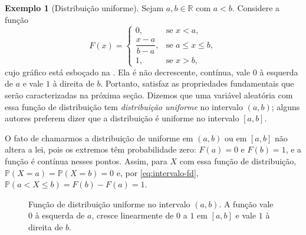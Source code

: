 \documentclass[12pt,portuguese]{article}
\theoremstyle{definition}
\newtheorem{example}[example]{Exemplo}
\theoremstyle{plainexercise}
\theoremstyle{starredexercise}
\theoremstyle{definition}
\begin{document}
\begin{example}[Distribuição uniforme]\label{ex:uniforme-fd}
  Sejam $a, b \in \mathbb{R}$ com $a < b$. Considere a função
  \begin{equation}\label{eq:fd-uniforme}
    F(x) = \begin{cases}
      0, & \text{se } x < a, \\[0.2cm]
      \dfrac{x-a}{b-a}, & \text{se } a \leqslant x \leqslant b, \\[0.2cm]
      1, & \text{se } x > b,
    \end{cases}
  \end{equation}
  cujo gráfico está esboçado na . Ela é não decrescente,
  contínua, vale $0$ à esquerda de $a$ e vale $1$ à direita de $b$. Portanto,
  satisfaz as propriedades fundamentais que serão caracterizadas na próxima
  seção. Dizemos que uma variável aleatória com essa função de distribuição tem
  \emph{distribuição uniforme} no intervalo
  $(a,b)$; alguns autores preferem dizer que a distribuição é uniforme no
  intervalo $[a,b]$.

  O fato de chamarmos a distribuição de uniforme em $(a,b)$ ou em $[a,b]$
  não altera a lei, pois os extremos têm probabilidade zero: $F(a)=0$ e
  $F(b)=1$, e a função é contínua nesses pontos. Assim, para $X$ com essa
  função de distribuição, $\mathbb{P}(X=a)=\mathbb{P}(X=b)=0$ e, por
  \eqref{eq:intervalo-fd}, $\mathbb{P}(a<X\leqslant b)=F(b)-F(a)=1$.
\end{example}

\begin{figure}[H]
\centering
{}
\caption{Função de distribuição uniforme no intervalo $(a,b)$. A função vale
$0$ à esquerda de $a$, cresce linearmente de $0$ a $1$ em $[a,b]$ e vale $1$ à
direita de $b$.}
\label{fig:fd-uniforme}
\end{figure}
\end{document}

